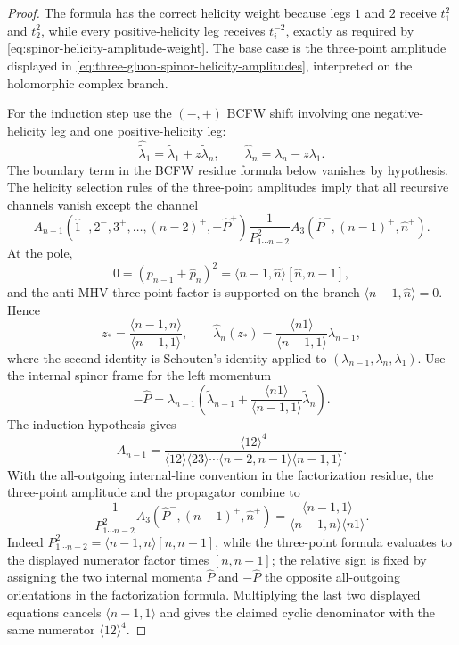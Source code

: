 \begin{proof}
The formula has the correct helicity weight because legs \(1\) and \(2\)
receive \(t_1^2\) and \(t_2^2\), while every positive-helicity leg receives
\(t_i^{-2}\), exactly as required by
\eqref{eq:spinor-helicity-amplitude-weight}.  The base case is the
three-point amplitude displayed in
\eqref{eq:three-gluon-spinor-helicity-amplitudes}, interpreted on the
holomorphic complex branch.

For the induction step use the \((-,+)\) BCFW shift involving one
negative-helicity leg and one positive-helicity leg:
\[
  \widehat{\widetilde\lambda}_1
  =
  \widetilde\lambda_1+z\widetilde\lambda_n,\qquad
  \widehat\lambda_n=\lambda_n-z\lambda_1 .
\]
The boundary term in the BCFW residue formula below vanishes by hypothesis.
The helicity selection rules of the three-point amplitudes
imply that all recursive channels vanish except the channel
\[
  A_{n-1}(\widehat1^-,2^-,3^+,\ldots,(n-2)^+,-\widehat P^+)
  \frac1{P_{1\cdots n-2}^2}
  A_3(\widehat P^-,(n-1)^+,\widehat n^+).
\]
At the pole,
\[
  0=(p_{n-1}+\widehat p_n)^2
   =
   \langle n-1,\widehat n\rangle[\widehat n,n-1],
\]
and the anti-MHV three-point factor is supported on the branch
\(\langle n-1,\widehat n\rangle=0\).  Hence
\[
  z_*=\frac{\langle n-1,n\rangle}{\langle n-1,1\rangle},
  \qquad
  \widehat\lambda_n(z_*)
  =
  \frac{\langle n1\rangle}{\langle n-1,1\rangle}\lambda_{n-1},
\]
where the second identity is Schouten's identity applied to
\((\lambda_{n-1},\lambda_n,\lambda_1)\).  Use the internal spinor frame for
the left momentum
\[
  -\widehat P
  =
  \lambda_{n-1}
  \left(
    \widetilde\lambda_{n-1}
    +\frac{\langle n1\rangle}{\langle n-1,1\rangle}
     \widetilde\lambda_n
  \right).
\]
The induction hypothesis gives
\[
  A_{n-1}
  =
  \frac{\langle12\rangle^4}
  {\langle12\rangle\langle23\rangle\cdots
   \langle n-2,n-1\rangle\langle n-1,1\rangle}.
\]
With the all-outgoing internal-line convention in the factorization residue,
the three-point amplitude and the propagator combine to
\[
  \frac1{P_{1\cdots n-2}^2}
  A_3(\widehat P^-,(n-1)^+,\widehat n^+)
  =
  \frac{\langle n-1,1\rangle}
       {\langle n-1,n\rangle\langle n1\rangle}.
\]
Indeed \(P_{1\cdots n-2}^2=\langle n-1,n\rangle[n,n-1]\), while the
three-point formula evaluates to the displayed numerator factor times
\([n,n-1]\); the relative sign is fixed by assigning the two internal momenta
\(\widehat P\) and \(-\widehat P\) the opposite all-outgoing orientations in the
factorization formula.  Multiplying the last two displayed equations cancels
\(\langle n-1,1\rangle\) and gives the claimed cyclic denominator with the
same numerator \(\langle12\rangle^4\).
\end{proof}

